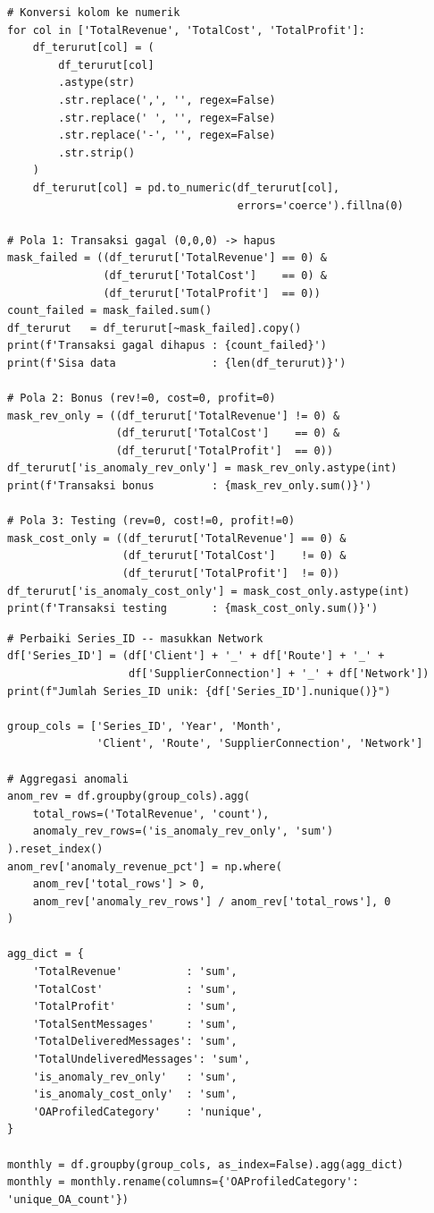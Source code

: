 \begin{lstlisting}[style=pycode,caption={Penandaan pola anomali pada data transaksi}]
# Konversi kolom ke numerik
for col in ['TotalRevenue', 'TotalCost', 'TotalProfit']:
    df_terurut[col] = (
        df_terurut[col]
        .astype(str)
        .str.replace(',', '', regex=False)
        .str.replace(' ', '', regex=False)
        .str.replace('-', '', regex=False)
        .str.strip()
    )
    df_terurut[col] = pd.to_numeric(df_terurut[col],
                                    errors='coerce').fillna(0)

# Pola 1: Transaksi gagal (0,0,0) -> hapus
mask_failed = ((df_terurut['TotalRevenue'] == 0) &
               (df_terurut['TotalCost']    == 0) &
               (df_terurut['TotalProfit']  == 0))
count_failed = mask_failed.sum()
df_terurut   = df_terurut[~mask_failed].copy()
print(f'Transaksi gagal dihapus : {count_failed}')
print(f'Sisa data               : {len(df_terurut)}')

# Pola 2: Bonus (rev!=0, cost=0, profit=0)
mask_rev_only = ((df_terurut['TotalRevenue'] != 0) &
                 (df_terurut['TotalCost']    == 0) &
                 (df_terurut['TotalProfit']  == 0))
df_terurut['is_anomaly_rev_only'] = mask_rev_only.astype(int)
print(f'Transaksi bonus         : {mask_rev_only.sum()}')

# Pola 3: Testing (rev=0, cost!=0, profit!=0)
mask_cost_only = ((df_terurut['TotalRevenue'] == 0) &
                  (df_terurut['TotalCost']    != 0) &
                  (df_terurut['TotalProfit']  != 0))
df_terurut['is_anomaly_cost_only'] = mask_cost_only.astype(int)
print(f'Transaksi testing       : {mask_cost_only.sum()}')
\end{lstlisting}

\begin{lstlisting}[style=pycode,caption={Agregasi bulanan per Series\_ID}]
# Perbaiki Series_ID -- masukkan Network
df['Series_ID'] = (df['Client'] + '_' + df['Route'] + '_' +
                   df['SupplierConnection'] + '_' + df['Network'])
print(f"Jumlah Series_ID unik: {df['Series_ID'].nunique()}")

group_cols = ['Series_ID', 'Year', 'Month',
              'Client', 'Route', 'SupplierConnection', 'Network']

# Aggregasi anomali
anom_rev = df.groupby(group_cols).agg(
    total_rows=('TotalRevenue', 'count'),
    anomaly_rev_rows=('is_anomaly_rev_only', 'sum')
).reset_index()
anom_rev['anomaly_revenue_pct'] = np.where(
    anom_rev['total_rows'] > 0,
    anom_rev['anomaly_rev_rows'] / anom_rev['total_rows'], 0
)

agg_dict = {
    'TotalRevenue'          : 'sum',
    'TotalCost'             : 'sum',
    'TotalProfit'           : 'sum',
    'TotalSentMessages'     : 'sum',
    'TotalDeliveredMessages': 'sum',
    'TotalUndeliveredMessages': 'sum',
    'is_anomaly_rev_only'   : 'sum',
    'is_anomaly_cost_only'  : 'sum',
    'OAProfiledCategory'    : 'nunique',
}

monthly = df.groupby(group_cols, as_index=False).agg(agg_dict)
monthly = monthly.rename(columns={'OAProfiledCategory': 'unique_OA_count'})
\end{lstlisting}

